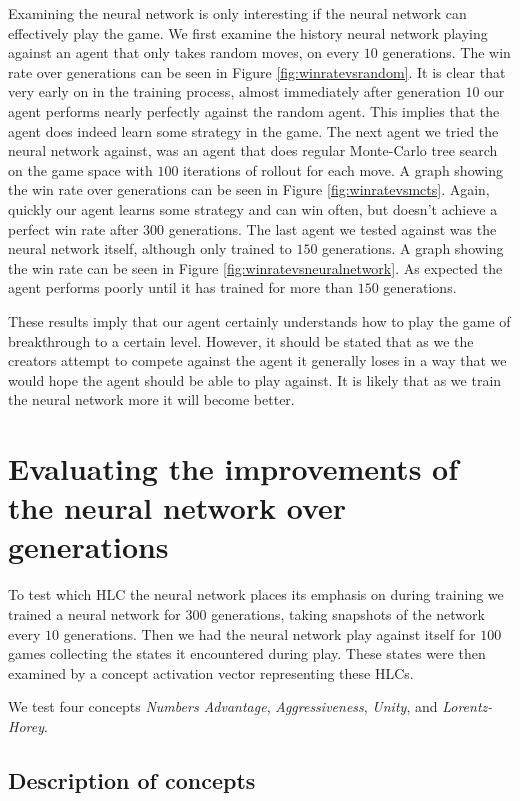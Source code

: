 Examining the neural network is only interesting if the neural network can effectively play the game. We first examine the history neural network playing against an agent that only takes random moves, on every $10$ generations. The win rate over generations can be seen in Figure \ref{fig:winratevsrandom}. It is clear that very early on in the training process, almost immediately after generation $10$ our agent performs nearly perfectly against the random agent. This implies that the agent does indeed learn some strategy in the game. The next agent we tried the neural network against, was an agent that does regular Monte-Carlo tree search on the game space with $100$ iterations of rollout for each move. A graph showing the win rate over generations can be seen in Figure \ref{fig:winratevsmcts}. Again, quickly our agent learns some strategy and can win often, but doesn't achieve a perfect win rate after $300$ generations. The last agent we tested against was the neural network itself, although only trained to $150$ generations. A graph showing the win rate can be seen in Figure \ref{fig:winratevsneuralnetwork}. As expected the agent performs poorly until it has trained for more than $150$ generations.

These results imply that our agent certainly understands how to play the game of breakthrough to a certain level. However, it should be stated that as we the creators attempt to compete against the agent it generally loses in a way that we would hope the agent should be able to play against. It is likely that as we train the neural network more it will become better.

\section{Evaluating the improvements of the neural network over generations}

To test which HLC the neural network places its emphasis on during training we trained a neural network for $300$ generations, taking snapshots of the network every $10$ generations. Then we had the neural network play against itself for $100$ games collecting the states it encountered during play. These states were then examined by a concept activation vector representing these HLCs.

We test four concepts \textit{Numbers Advantage}, \textit{Aggressiveness}, \textit{Unity}, and \textit{Lorentz-Horey}.

\subsection{Description of concepts}

